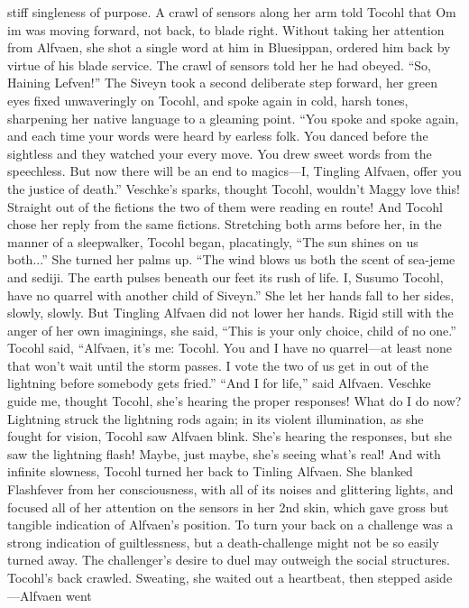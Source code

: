 \documentclass[9pt]{article}
\begin{document}
stiff singleness of purpose.
A crawl of sensors along her arm told Tocohl that Om im was moving forward, not back, to blade
right. Without taking her attention from Alfvaen, she shot a single word at him in Bluesippan, ordered him
back by virtue of his blade service. The crawl of sensors told her he had obeyed.
“So, Haining Lefven!” The Siveyn took a second deliberate step forward, her green eyes fixed
unwaveringly on Tocohl, and spoke again in cold, harsh tones, sharpening her native language to a
gleaming point. “You spoke and spoke again, and each time your words were heard by earless folk. You
danced before the sightless and they watched your every move. You drew sweet words from the
speechless. But now there will be an end to magics—I, Tingling Alfvaen, offer you the justice of death.”
Veschke’s sparks, thought Tocohl, wouldn’t Maggy love this! Straight out of the fictions the two of
them were reading en route! And Tocohl chose her reply from the same fictions.
Stretching both arms before her, in the manner of a sleepwalker, Tocohl began, placatingly, “The sun
shines on us both...” She turned her palms up. “The wind blows us both the scent of sea-jeme and sediji.
The earth pulses beneath our feet its rush of life. I, Susumo Tocohl, have no quarrel with another child of
Siveyn.”
She let her hands fall to her sides, slowly, slowly.
But Tingling Alfvaen did not lower her hands. Rigid still with the anger of her own imaginings, she
said, “This is your only choice, child of no one.”
Tocohl said, “Alfvaen, it’s me: Tocohl. You and I have no quarrel—at least none that won’t wait until
the storm passes. I vote the two of us get in out of the lightning before somebody gets fried.”
“And I for life,” said Alfvaen.
Veschke guide me, thought Tocohl, she’s hearing the proper responses! What do I do now?Lightning struck the lightning rods again; in its violent illumination, as she fought for vision, Tocohl saw
Alfvaen blink. She’s hearing the responses, but she saw the lightning flash! Maybe, just maybe, she’s
seeing what’s real!
And with infinite slowness, Tocohl turned her back to Tinling Alfvaen. She blanked Flashfever from
her consciousness, with all of its noises and glittering lights, and focused all of her attention on the sensors
in her 2nd skin, which gave gross but tangible indication of Alfvaen’s position.
To turn your back on a challenge was a strong indication of guiltlessness, but a death-challenge might
not be so easily turned away. The challenger’s desire to duel may outweigh the social structures.
Tocohl’s back crawled. Sweating, she waited out a heartbeat, then stepped aside—Alfvaen went
\end{document}
